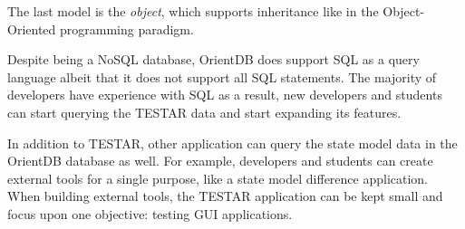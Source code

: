 The last model is the \hypertarget{db:object}{\emph{object}}, which supports inheritance like in the Object-Oriented programming paradigm.\par

Despite being a NoSQL database, OrientDB does support SQL as a query language \cite{sql-lang} albeit that it does not support all SQL statements. The majority of developers have experience with SQL \cite{sql-stats} as a result, new developers and students can start querying the TESTAR data and start expanding its features.\par

In addition to TESTAR, other application can query the state model data in the OrientDB database as well. For example, developers and students can create external tools for a single purpose, like a state model difference application. When building external tools, the TESTAR application can be kept small and focus upon one objective: testing GUI applications. 